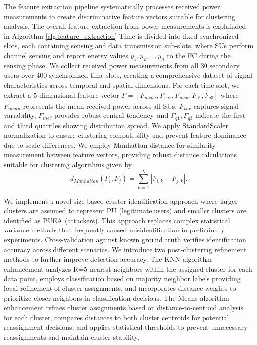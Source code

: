 \documentclass[pdflatex,sn-mathphys-num]{sn-jnl}%
\theoremstyle{thmstyleone}
\theoremstyle{thmstyletwo}
\theoremstyle{thmstylethree}
\begin{document}
The feature extraction pipeline systematically processes received power measurements to create discriminative feature vectors suitable for clustering analysis. The overall feature extraction from power measurements is explainded in Algorithm \ref{alg:feature_extraction} Time is divided into fixed synchronized slots, each containing sensing and data transmission sub-slots, where SUs perform channel sensing and report energy values $y_1, y_2, \ldots, y_n$ to the FC during the sensing phase. We collect received power measurements from all 30 secondary users over 400 synchronized time slots, creating a comprehensive dataset of signal characteristics across temporal and spatial dimensions. For each time slot, we extract a 5-dimensional feature vector $F = [F_{mean}, F_{var}, F_{med}, F_{q1}, F_{q3}]$ where $F_{mean}$ represents the mean received power across all SUs, $F_{var}$ captures signal variability, $F_{med}$ provides robust central tendency, and $F_{q1}, F_{q3}$ indicate the first and third quartiles showing distribution spread. We apply StandardScaler normalization to ensure clustering compatibility and prevent feature dominance due to scale differences. We employ Manhattan distance for similarity measurement between feature vectors, providing robust distance calculations suitable for clustering algorithms given by \begin{equation}
    d_{Manhattan}(F_i, F_j) = \sum_{k=1}^{5} |F_{i,k} - F_{j,k}|.
    \label{eq:manhattan_dist}
\end{equation}

We implement a novel size-based cluster identification approach where larger clusters are assumed to represent PU (legitimate users) and smaller clusters are identified as PUEA (attackers). This approach replaces complex statistical variance methods that frequently caused misidentification in preliminary experiments. Cross-validation against known ground truth verifies identification accuracy across different scenarios. We introduce two post-clustering refinement methods to further improve detection accuracy. The KNN algorithm enhancement analyzes R=5 nearest neighbors within the assigned cluster for each data point, employs classification based on majority neighbor labels providing local refinement of cluster assignments, and incorporates distance weights to prioritize closer neighbors in classification decisions. The Means algorithm enhancement refines cluster assignments based on distance-to-centroid analysis for each cluster, compares distances to both cluster centroids for potential reassignment decisions, and applies statistical thresholds to prevent unnecessary reassignments and maintain cluster stability.
\end{document}
